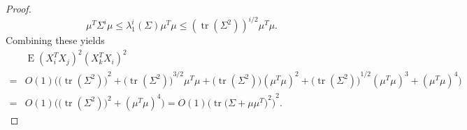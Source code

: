 \documentclass[review]{elsarticle}
\DeclareMathOperator{\mytr}{tr}
\DeclareMathOperator{\myE}{E}
\theoremstyle{plain}
\theoremstyle{definition}
\theoremstyle{remark}
\begin{document}
\begin{proof}
\begin{equation*}
    \mu^T \Sigma^i \mu
    \leq \lambda_{1}^i(\Sigma)\mu^T\mu
    \leq {(\mytr (\Sigma^2))}^{i/2}\mu^T\mu.
    \end{equation*}
        Combining these yields
        \begin{equation*}
        \begin{aligned}
            &\myE{(X_i^T X_j)}^2{(X_k^T X_i)}^2\\
            =&
            O(1)\Big({\big(\mytr (\Sigma^2)\big)}^2+
            {\big(\mytr (\Sigma^2)\big)}^{3/2}\mu^T \mu+
            {\big(\mytr (\Sigma^2)\big)}{(\mu^T \mu)}^2
            +
            {\big(\mytr (\Sigma^2)\big)}^{1/2}{(\mu^T \mu)}^3+
            {(\mu^T \mu)}^4
            \Big)\\
            =&O(1)
            \Big(\big(\mytr(\Sigma^2)\big)^2 + (\mu^T \mu)^4 \Big)
            = O(1){\Big(\mytr {\big(\Sigma+\mu\mu^T\big)}^2\Big)}^2.
        \end{aligned}
        \end{equation*}
\end{proof}
\end{document}
